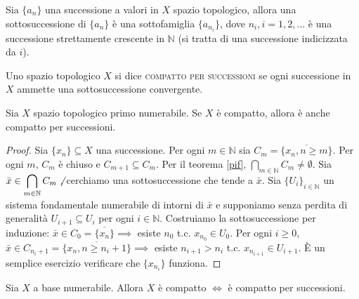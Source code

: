 Sia $\{a_n\}$ una successione a valori in $X$ spazio topologico, allora una sottosuccessione di $\{a_n\}$ è una sottofamiglia $\{a_{n_i}\}$, dove $n_i, i=1, 2, \dots$ è una successione strettamente crescente in $\mathbb{N}$ (si tratta di una successione indicizzata da $i$).

\begin{defn}
  Uno spazio topologico $X$ si dice \textsc{compatto per successioni} se ogni successione in $X$ ammette una sottosuccessione convergente.
\end{defn}

\begin{prop} \label{N1->(c->cs)}
  Sia $X$ spazio topologico primo numerabile. Se $X$ è compatto, allora è anche compatto per successioni.
\end{prop}

\begin{proof}
  Sia $\{x_n\} \subseteq X$ una successione. Per ogni $m \in \mathbb{N}$ sia $C_m=\overline{\{x_n, n \ge m\}}$. Per ogni $m$, $C_m$ è chiuso e $C_{m+1} \subseteq C_m$. Per il teorema \ref{pif}, $\displaystyle \bigcap_{m \in \mathbb{N}} C_m \not=\emptyset$.
  Sia $\displaystyle \bar{x} \in \bigcap_{m \in \mathbb{N}} C_m \not$, cerchiamo una sottosuccessione che tende a $\bar{x}$. Sia $\{U_i\}_{i \in \mathbb{N}}$ un sistema fondamentale numerabile di intorni di $\bar{x}$ e supponiamo senza perdita di generalità $U_{i+1} \subseteq U_i$ per ogni $i \in \mathbb{N}$. Costruiamo la sottosuccessione per induzione:
  $\bar{x} \in C_0=\overline{\{x_n\}} \implies$ esiste $n_0$ t.c. $x_{n_0} \in U_0$. Per ogni $i \ge 0$, $\bar{x} \in C_{n_i+1}=\overline{\{x_n, n \ge n_i+1\}} \implies$ esiste $n_{i+1}>n_i$ t.c.
  $x_{n_{i+1}} \in U_{i+1}$. È un semplice esercizio verificare che $\{x_{n_i}\}$ funziona.
\end{proof}

\begin{thm} \label{bn->(c_sse_cs)}
  Sia $X$ a base numerabile. Allora $X$ è compatto $\Leftrightarrow$ è compatto per successioni.
\end{thm}

